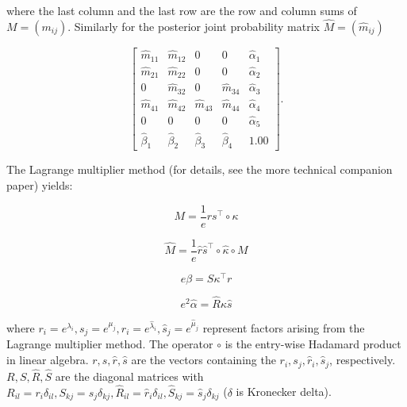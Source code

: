 \documentclass[11pt]{article}
\begin{document}
where the last column and the last row are the row and column sums of
$M=(m_{ij})$. Similarly for the posterior joint probability matrix
$\hat{M}=(\hat{m}_{ij})$

\begin{equation}
  \label{eq:p6}
      \left[
      \begin{array}{ccccc}
        \hat{m}_{11} & \hat{m}_{12} & 0 & 0 & \hat{\alpha}_{1} \\
        \hat{m}_{21} & \hat{m}_{22} & 0 & 0 & \hat{\alpha}_{2} \\
        0 & \hat{m}_{32} & 0 & \hat{m}_{34} & \hat{\alpha}_{3} \\
        \hat{m}_{41} & \hat{m}_{42} & \hat{m}_{43} & \hat{m}_{44} & \hat{\alpha}_{4} \\
        0 & 0 & 0 & 0 & \hat{\alpha}_{5} \\
        \hat{\beta}_{1} & \hat{\beta}_{2} & \hat{\beta}_{3} & \hat{\beta}_{4} & 1.00
      \end{array}
\right].
\end{equation}

The Lagrange multiplier method (for details, see the more technical
companion paper) yields:

\begin{equation}
  \label{eq:m1}
  M=\frac{1}{e}rs^{\intercal}\circ\kappa
\end{equation}

\begin{equation}
  \label{eq:m2}
  \hat{M}=\frac{1}{e}\hat{r}\hat{s}^{\intercal}\circ\hat{\kappa}\circ{}M
\end{equation}



\begin{equation}
  \label{eq:m3}
  e\beta=S\kappa^{\intercal}r
\end{equation}

\begin{equation}
  \label{eq:m4}
  e^{2}\hat{\alpha}=\hat{R}\kappa{}\hat{s}
\end{equation}

where
$r_{i}=e^{\lambda_{i}},s_{j}=e^{\mu_{j}},\hat{r}_{i}=e^{\hat{\lambda}_{i}},\hat{s}_{j}=e^{\hat{\mu}_{j}}$
represent factors arising from the Lagrange multiplier method. The
operator $\circ$ is the entry-wise Hadamard product in linear algebra.
$r,s,\hat{r},\hat{s}$ are the vectors containing the
$r_{i},s_{j},\hat{r}_{i},\hat{s}_{j}$, respectively.
$R,S,\hat{R},\hat{S}$ are the diagonal matrices with
$R_{il}=r_{i}\delta_{il},S_{kj}=s_{j}\delta_{kj},\hat{R}_{il}=\hat{r}_{i}\delta_{il},\hat{S}_{kj}=\hat{s}_{j}\delta_{kj}$
($\delta$ is Kronecker delta). 
\end{document}
